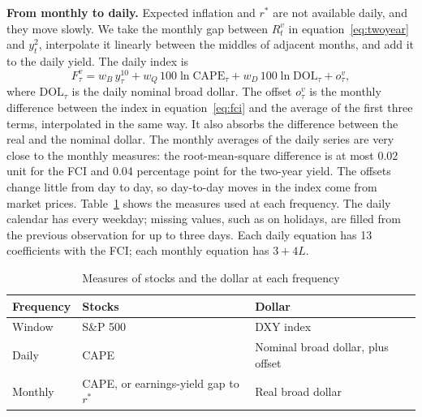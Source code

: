 \documentclass[11pt]{article}
\newcommand{\rs}{r^{*}}
\begin{document}
\textbf{From monthly to daily.} Expected inflation and $\rs$ are not available daily, and they move slowly. We take the monthly gap between $R_t^{v}$ in equation~\eqref{eq:twoyear} and $y^{2}_t$, interpolate it linearly between the middles of adjacent months, and add it to the daily yield. The daily index is
\begin{equation}
F_\tau^{v} = w_B\, y^{10}_\tau + w_Q\, 100\ln\text{CAPE}_\tau + w_D\, 100\ln\text{DOL}_\tau + o_\tau^{v}, \label{eq:dailyfci}
\end{equation}
where $\text{DOL}_\tau$ is the daily nominal broad dollar. The offset $o_\tau^{v}$ is the monthly difference between the index in equation~\eqref{eq:fci} and the average of the first three terms, interpolated in the same way. It also absorbs the difference between the real and the nominal dollar. The monthly averages of the daily series are very close to the monthly measures: the root-mean-square difference is at most 0.02 unit for the FCI and 0.04 percentage point for the two-year yield. The offsets change little from day to day, so day-to-day moves in the index come from market prices. Table~\ref{tab:measures} shows the measures used at each frequency. The daily calendar has every weekday; missing values, such as on holidays, are filled from the previous observation for up to three days. Each daily equation has 13 coefficients with the FCI; each monthly equation has $3+4L$.

\begin{table}[H]\centering\small
\caption{Measures of stocks and the dollar at each frequency}\label{tab:measures}
\begin{tabular}{lll}\toprule
Frequency & Stocks & Dollar \\\midrule
Window & S\&P 500 & DXY index \\
Daily & CAPE & Nominal broad dollar, plus offset \\
Monthly & CAPE, or earnings-yield gap to $\rs$ & Real broad dollar \\\bottomrule
\end{tabular}
\end{table}
\end{document}

